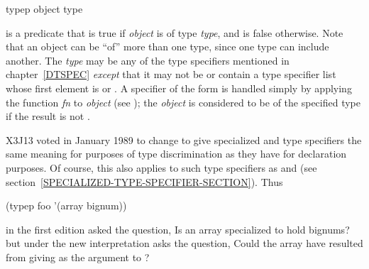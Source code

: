 \begin{defun}[Function]
typep object type

 is a predicate that
is true if \emph{object} is of type \emph{type}, and is false otherwise.
Note that an object can be ``of'' more than one type, since one type can
include another.  The \emph{type} may be any of the type specifiers
mentioned in chapter~\ref{DTSPEC} \emph{except} that it may not
be or contain a type specifier list whose first element is 
or .
A specifier of the form  is handled simply
by applying the function \emph{fn} to \emph{object}
(see ); the \emph{object} is considered
to be of the specified type if the result is not {\false}.

\begin{new}
X3J13 voted in January 1989
to change  to give specialized
 and  type specifiers the same meaning for
purposes of type discrimination as they have for declaration purposes.
Of course, this also applies to such type specifiers as 
and 
(see section~\ref{SPECIALIZED-TYPE-SPECIFIER-SECTION}).
Thus
\begin{lisp}
(typep foo '(array bignum))
\end{lisp}
in the first edition asked the question, Is  an array
specialized to hold bignums? but under the new interpretation
asks the question, Could the array  have resulted from
giving  as the  argument
to ?
\end{new}
\end{defun}

